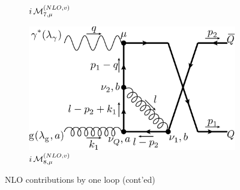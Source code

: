 \begin{figure}[ht!]
\begin{subfigure}[t]{.4\textwidth}
		\caption{$i\operatorname{\mathcal M}^{(NLO,v)}_{7,\mu}$}
	\end{subfigure}\hspace{.15\textwidth}%
	\begin{subfigure}[t]{.4\textwidth}
		\includegraphics[width=\textwidth]{pyfeyn/nlo-v-g1cr}
		\caption{$i\operatorname{\mathcal M}^{(NLO,v)}_{8,\mu}$}
	\end{subfigure}
	\caption{NLO contributions by one loop (cont'ed)}\label{fig:FeynNLOvcd}
\end{figure}

